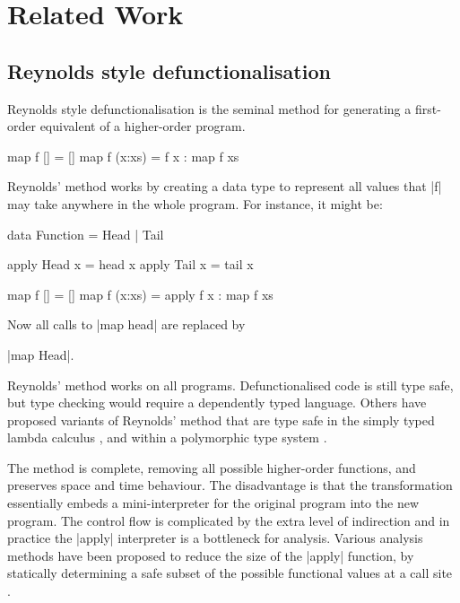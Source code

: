 \documentclass[preprint]{sigplanconf}
\begin{document}
\section{Related Work}
\label{sec:related}

\subsection{Reynolds style defunctionalisation}

Reynolds style defunctionalisation \cite{reynolds:defunc} is the seminal method for generating a first-order equivalent of a higher-order program.

\begin{example}
\begin{code}
map f []      = []
map f (x:xs)  = f x : map f xs
\end{code}

\noindent Reynolds' method works by creating a data type to represent all values that |f| may take anywhere in the whole program. For instance, it might be:

\ignore\begin{code}
data Function = Head | Tail

apply Head  x = head  x
apply Tail  x = tail  x

map f []      = []
map f (x:xs)  = apply f x : map f xs
\end{code}

\noindent Now all calls to |map head| are replaced by \ignore|map Head|.
\end{example}

Reynolds' method works on all programs. Defunctionalised code is still type safe, but type checking would require a dependently typed language. Others have proposed variants of Reynolds' method that are type safe in the simply typed lambda calculus \cite{bell:type_driven_defunctionalization}, and within a polymorphic type system \cite{pottier:polymorhpic_typed_defunctionaization}.

The method is complete, removing all possible higher-order functions, and preserves space and time behaviour. The disadvantage is that the transformation essentially embeds a mini-interpreter for the original program into the new program. The control flow is complicated by the extra level of indirection and in practice the |apply| interpreter is a bottleneck for analysis. Various analysis methods have been proposed to reduce the size of the |apply| function, by statically determining a safe subset of the possible functional values at a call site \cite{cejtin:closure_conversion,grin}.
\end{document}
